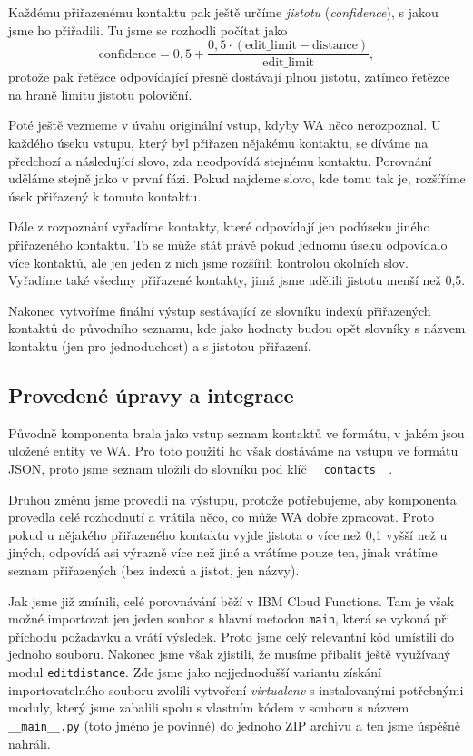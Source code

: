 Každému přiřazenému kontaktu pak ještě určíme \textit{jistotu} (\textit{confidence}),
s jakou jsme ho přiřadili. Tu jsme se rozhodli počítat jako
\[ \text{confidence} = 0,5 + \frac{0,5 \cdot (\text{edit\_limit} - \text{distance})}{\text{edit\_limit}} ,\]
protože pak řetězce odpovídající přesně dostávají plnou jistotu, zatímco řetězce na
hraně limitu jistotu poloviční.

Poté ještě vezmeme v úvahu originální vstup, kdyby WA něco nerozpoznal. U každého
úseku vstupu, který byl přiřazen nějakému kontaktu, se díváme na předchozí a následující
slovo, zda neodpovídá stejnému kontaktu. Porovnání uděláme stejně jako v první fázi.
Pokud najdeme slovo, kde tomu tak je, rozšíříme úsek přiřazený k tomuto kontaktu.

Dále z rozpoznání vyřadíme kontakty, které odpovídají jen podúseku jiného
přiřazeného kontaktu. To se může stát právě pokud jednomu úseku odpovídalo více
kontaktů, ale jen jeden z nich jsme rozšířili kontrolou okolních slov. Vyřadíme také
všechny přiřazené kontakty, jimž jsme udělili jistotu menší než 0,5.

Nakonec vytvoříme finální výstup sestávající ze slovníku indexů přiřazených kontaktů
do původního seznamu, kde jako hodnoty budou opět slovníky s názvem kontaktu (jen pro
jednoduchost) a s jistotou přiřazení.

\subsection{Provedené úpravy a integrace}

Původně komponenta brala jako vstup seznam kontaktů ve formátu, v jakém jsou uložené
entity ve WA. Pro toto použití ho však dostáváme na vstupu ve formátu JSON, proto
jsme seznam uložili do slovníku pod klíč \texttt{\_\_contacts\_\_}.

Druhou změnu jsme provedli na výstupu, protože potřebujeme, aby komponenta provedla
celé rozhodnutí a vrátila něco, co může WA dobře zpracovat. Proto pokud u nějakého
přiřazeného kontaktu vyjde jistota o více než 0,1 vyšší než u jiných, odpovídá asi
výrazně více než jiné a vrátíme pouze
ten, jinak vrátíme seznam přiřazených (bez indexů a jistot, jen názvy).

Jak jsme již zmínili, celé porovnávání běží v IBM Cloud Functions. Tam je však možné
importovat jen jeden soubor s hlavní metodou \texttt{main}, která se vykoná při
příchodu požadavku a vrátí výsledek. Proto jsme celý relevantní kód umístili do
jednoho souboru. Nakonec jsme však zjistili, že musíme přibalit ještě využívaný
modul \texttt{editdistance}. Zde jsme jako nejjednodušší variantu získání importovatelného souboru
zvolili vytvoření \textit{virtualenv} s instalovanými potřebnými moduly,
který jsme zabalili spolu s vlastním kódem v souboru s názvem \texttt{\_\_main\_\_.py}
(toto jméno je povinné) do jednoho ZIP archivu a ten jsme úspěšně nahráli.